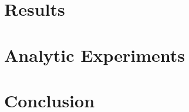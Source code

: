 \documentclass[runningheads]{llncs}
\begin{document}
\label{sec_method}





\section{Results}

\label{sec_results}





\section{Analytic Experiments}

\label{sec_analysis}





\section{Conclusion}

\label{sec_conclusion}








\end{document}
